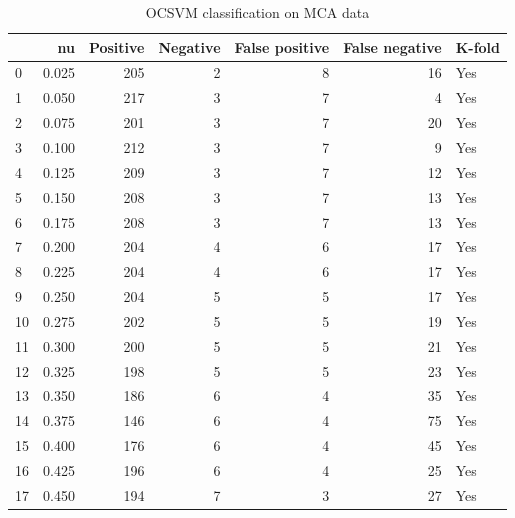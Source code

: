 \documentclass[a4paper,twoside,12pt]{book}
\begin{document}
\begin{appendices}
\begin{table}
	\centering
	\caption{OCSVM classification on MCA data}
	\label{id:tab:OCSVMonMCA}
	\begin{tabular}{lrrrrrl}
		\toprule
		{} &     nu &  Positive &  Negative &  False positive &  False negative & K-fold \\
		\midrule
		0  &  0.025 &       205 &         2 &               8 &              16 &    Yes \\
		1  &  0.050 &       217 &         3 &               7 &               4 &    Yes \\
		2  &  0.075 &       201 &         3 &               7 &              20 &    Yes \\
		3  &  0.100 &       212 &         3 &               7 &               9 &    Yes \\
		4  &  0.125 &       209 &         3 &               7 &              12 &    Yes \\
		5  &  0.150 &       208 &         3 &               7 &              13 &    Yes \\
		6  &  0.175 &       208 &         3 &               7 &              13 &    Yes \\
		7  &  0.200 &       204 &         4 &               6 &              17 &    Yes \\
		8  &  0.225 &       204 &         4 &               6 &              17 &    Yes \\
		9  &  0.250 &       204 &         5 &               5 &              17 &    Yes \\
		10 &  0.275 &       202 &         5 &               5 &              19 &    Yes \\
		11 &  0.300 &       200 &         5 &               5 &              21 &    Yes \\
		12 &  0.325 &       198 &         5 &               5 &              23 &    Yes \\
		13 &  0.350 &       186 &         6 &               4 &              35 &    Yes \\
		14 &  0.375 &       146 &         6 &               4 &              75 &    Yes \\
		15 &  0.400 &       176 &         6 &               4 &              45 &    Yes \\
		16 &  0.425 &       196 &         6 &               4 &              25 &    Yes \\
		17 &  0.450 &       194 &         7 &               3 &              27 &    Yes \\

\end{tabular}
\end{table}
\end{appendices}
\end{document}
